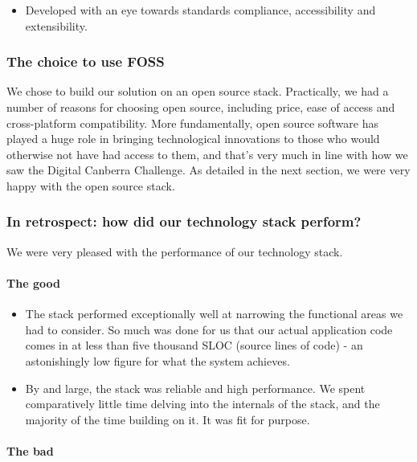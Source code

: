 \documentclass[12pt,a4paper,twosided]{article}
\begin{document}
\begin{itemize}
  \begin{itemize}
  
  \item
    Developed with an eye towards standards compliance, accessibility
    and extensibility.
  \end{itemize}
\end{itemize}

\subsubsection{The choice to use FOSS}

We chose to build our solution on an open source stack. Practically, we
had a number of reasons for choosing open source, including price, ease
of access and cross-platform compatibility. More fundamentally, open
source software has played a huge role in bringing technological
innovations to those who would otherwise not have had access to them,
and that's very much in line with how we saw the Digital Canberra
Challenge. As detailed in the next section, we were very happy with the
open source stack.

\subsubsection{In retrospect: how did our technology stack perform?}

We were very pleased with the performance of our technology stack.

\paragraph{The good}

\begin{itemize}

\item
  The stack performed exceptionally well at narrowing the functional
  areas we had to consider. So much was done for us that our actual
  application code comes in at less than five thousand SLOC (source
  lines of code) - an astonishingly low figure for what the system
  achieves.
\item
  By and large, the stack was reliable and high performance. We spent
  comparatively little time delving into the internals of the stack, and
  the majority of the time building on it. It was fit for purpose.
\end{itemize}

\paragraph{The bad}
\end{document}
